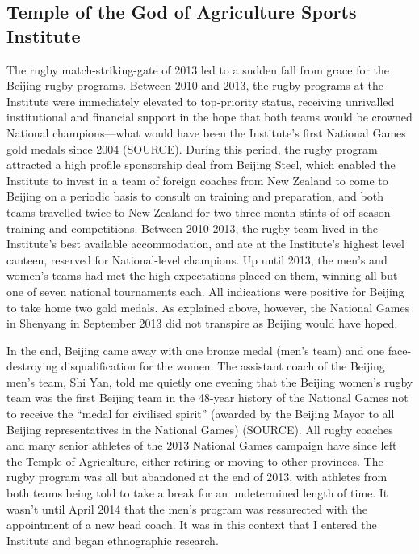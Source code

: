 {\subsection{Temple of the God of Agriculture Sports Institute}
The rugby match-striking-gate of 2013 led to a sudden fall from grace for the Beijing rugby programs.  Between 2010 and 2013, the rugby programs at the Institute were immediately elevated to top-priority status, receiving unrivalled institutional and financial support in the hope that both teams would be crowned National champions---what would have been the Institute's first National Games gold medals since 2004 (SOURCE).  During this period, the rugby program attracted a high profile sponsorship deal from Beijing Steel, which enabled the Institute to invest in a team of foreign coaches from New Zealand to come to Beijing on a periodic basis to consult on training and preparation, and both teams travelled twice to New Zealand for two three-month stints of off-season training and competitions.  Between 2010-2013, the rugby team lived in the Institute's best available accommodation, and ate at the Institute's highest level canteen, reserved for National-level champions.  Up until 2013, the men's and women's teams had met the high expectations placed on them, winning all but one of seven national tournaments each. All indications were positive for Beijing to take home two gold medals. As explained above, however, the National Games in Shenyang in September 2013 did not transpire as Beijing would have hoped.

In the end, Beijing came away with one bronze medal (men's team) and one face-destroying disqualification for the women.  The assistant coach of the Beijing men's team, Shi Yan, told me quietly one evening that the Beijing women's rugby team was the first Beijing team in the 48-year history of the National Games not to receive the ``medal for civilised spirit''  (awarded by the Beijing Mayor to all Beijing representatives in the National Games) (SOURCE).  All rugby coaches and many senior athletes of the 2013 National Games campaign have since left the Temple of Agriculture, either retiring or moving to other provinces.  The rugby program was all but abandoned at the end of 2013, with athletes from both teams being told to take a break for an undetermined length of time.  It wasn't until April 2014 that the men's program was ressurected with the appointment of a new head coach.  It was in this context that I entered the Institute and began ethnographic research.


}

